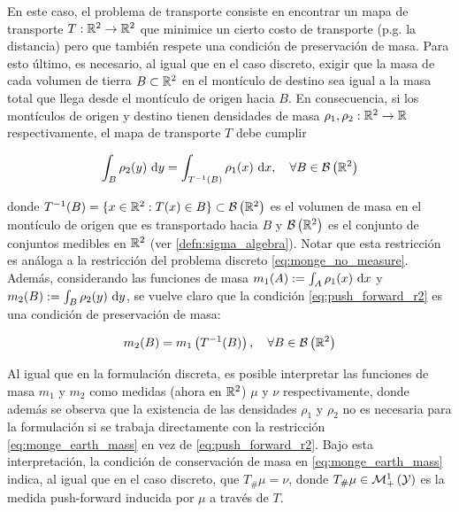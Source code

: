 
En este caso, el problema de transporte consiste en encontrar un mapa de transporte $T:\mathbb{R}^2\to\mathbb{R}^2$ que minimice un cierto costo de transporte (p.g. la distancia) pero que también respete una condición de preservación de masa. Para esto último, es necesario, al igual que en el caso discreto, exigir que la masa de cada volumen de tierra $B\subset\mathbb{R}^2$ en el montículo de destino sea igual a la masa total que llega desde el montículo de origen hacia $B$. En consecuencia, si los montículos de origen y destino tienen densidades de masa $\rho_1,\rho_2:\mathbb{R}^2\to\mathbb{R}$ respectivamente, el mapa de transporte $T$ debe cumplir

\begin{equation}
	\label{eq:push_forward_r2}
	\int_{B} \rho_2(y) \,\operatorname{d}\! y = \int_{T^{-1}(B)} \rho_1(x) \,\operatorname{d}\! x,
	\quad\forall B\in\mathcal{B}\left(\mathbb{R}^2\right)
\end{equation}

donde $T^{-1}(B) = \{x\in\mathbb{R}^2 : T(x)\in B\}\subset\mathcal{B}\left(\mathbb{R}^2\right)$ es el volumen de masa en el montículo de origen que es transportado hacia $B$ y $\mathcal{B}\left(\mathbb{R}^2\right)$ es el conjunto de conjuntos medibles en $\mathbb{R}^2$ (ver \autoref{defn:sigma_algebra}). Notar que esta restricción es análoga a la restricción del problema discreto \eqref{eq:monge_no_measure}. Además, considerando las funciones de masa $m_1(A) := \int_A \rho_1(x)\,\operatorname{d}\! x$ y $m_2(B) := \int_B \rho_2(y)\,\operatorname{d}\! y$, se vuelve claro que la condición \eqref{eq:push_forward_r2} es una condición de preservación de masa:

\begin{equation}
	\label{eq:monge_earth_mass}
	m_2(B) = m_1\left(T^{-1}(B)\right),
	\quad\forall B\in\mathcal{B}\left(\mathbb{R}^2\right)
\end{equation}

Al igual que en la formulación discreta, es posible interpretar las funciones de masa $m_1$ y $m_2$ como medidas (ahora en $\mathbb{R}^2$) $\mu$ y $\nu$ respectivamente, donde además se observa que la existencia de las densidades $\rho_1$ y $\rho_2$ no es necesaria para la formulación si se trabaja directamente con la restricción \eqref{eq:monge_earth_mass} en vez de \eqref{eq:push_forward_r2}. Bajo esta interpretación, la condición de conservación de masa en \eqref{eq:monge_earth_mass} indica, al igual que en el caso discreto, que $T_\#\mu = \nu$, donde $T_\#\mu\in\mathcal{M}_+^1\left(\mathcal{Y}\right)$ es la medida push-forward inducida por $\mu$ a través de $T$.

